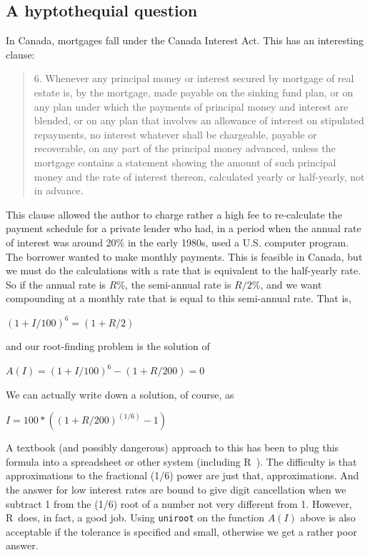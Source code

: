 \documentclass[11pt,letterpaper]{article}
\newcommand{\R}{{\sf R\ }}
\begin{document}
\subsection{A hyptothequial question}

In Canada, mortgages fall under the Canada Interest Act. This has an interesting clause:

\begin{quote}
6.	Whenever any principal money or interest secured by mortgage of real estate is, by the mortgage, made payable on the sinking fund plan, or on any plan under which the payments of principal money and interest are blended, or on any plan that involves an allowance of interest on stipulated repayments, no interest whatever shall be chargeable, payable or recoverable, on any part of the principal money advanced, unless the mortgage contains a statement showing the amount of such principal money and the rate of interest thereon, calculated yearly or half-yearly, not in advance. 
\end{quote}

This clause allowed the author to charge rather a high fee to re-calculate the payment schedule
for a private lender who had, in a period when the annual rate of interest was around 20\%
in the early 1980s, used a U.S. computer program. The borrower wanted to make monthly 
payments. This is feasible in Canada, but we must do the calculations with a rate that 
is equivalent to the half-yearly rate. So if the annual rate is $R$\%, the semi-annual rate
is $R/2$\%, and we want compounding at a monthly rate that is equal to this semi-annual
rate. That is, 

$  (1 + I/100)^6 = (1 + R/2)  $

and our root-finding problem is the solution of 

$  A(I) = (1 + I/100)^6 - (1 + R/200)  = 0 $

We can actually write down a solution, of course, as

$   I = 100 * ((1 + R/200)^(1/6) - 1) $

A textbook (and possibly dangerous) approach to this has been to plug this formula into
a spreadsheet or other system (including \R). The difficulty is that approximations to 
the fractional (1/6) power are just that, approximations. And the answer for low 
interest rates are bound to give digit cancellation when we subtract 1 from the (1/6)
root of a number not very different from 1. However, \R  does, in fact, a good job. Using
\texttt{uniroot} on the function $A(I)$ above is also acceptable if the tolerance is
specified and small, otherwise we get a rather poor answer. 
\end{document}
